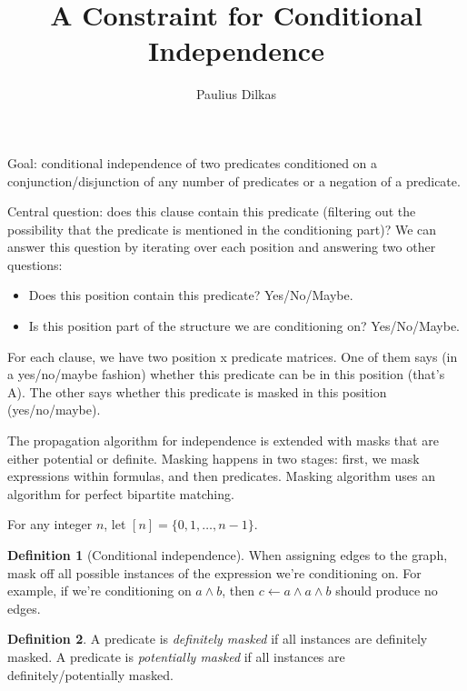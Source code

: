 \documentclass{article}
\author{Paulius Dilkas}
\title{A Constraint for Conditional Independence}
\theoremstyle{definition}
\newtheorem{definition}{Definition}
\begin{document}
\maketitle

Goal: conditional independence of two predicates conditioned on a
conjunction/disjunction of any number of predicates or a negation of a
predicate.

Central question: does this clause contain this predicate (filtering out
the possibility that the predicate is mentioned in the conditioning part)? We
can answer this question by iterating over each position and answering two other
questions:
\begin{itemize}
\item Does this position contain this predicate? Yes/No/Maybe.
\item Is this position part of the structure we are conditioning on? Yes/No/Maybe.
\end{itemize}

For each clause, we have two position x predicate matrices. One of them says (in
a yes/no/maybe fashion) whether this predicate can be in this position (that's
A). The other says whether this predicate is masked in this position
(yes/no/maybe).

The propagation algorithm for independence is extended with masks that are
either potential or definite. Masking happens in two stages: first, we mask
expressions within formulas, and then predicates. Masking algorithm uses an
algorithm for perfect bipartite matching.

For any integer $n$, let $[n] = \{ 0, 1, \dots, n-1 \}$.

\begin{definition}[Conditional independence]
  When assigning edges to the graph, mask off all possible instances of the
  expression we're conditioning on. For example, if we're conditioning on $a
  \land b$, then $c \gets a \land a \land b$ should produce no edges.
\end{definition}

\begin{definition}
  A predicate is \emph{definitely masked} if all instances are definitely
  masked. A predicate is \emph{potentially masked} if all instances are
  definitely/potentially masked.
\end{definition}
\end{document}
